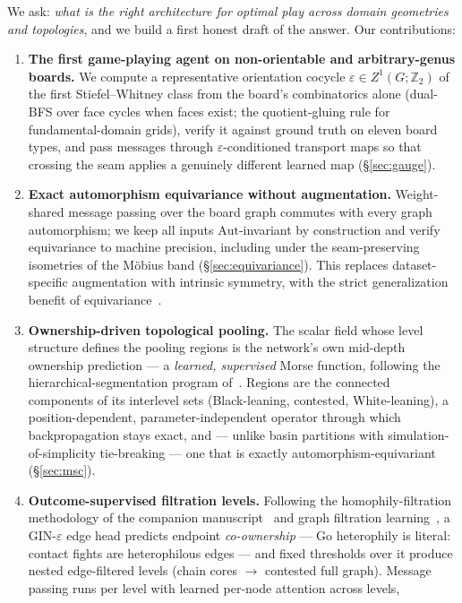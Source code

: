 \documentclass[11pt]{article}
\newcommand{\eps}{\varepsilon}
\newcommand{\Aut}{\mathrm{Aut}}
\newcommand{\ZZ}{\mathbb{Z}}
\begin{document}
We ask: \emph{what is the right architecture for optimal play across
domain geometries and topologies}, and we build a first honest draft of
the answer. Our contributions:
\begin{enumerate}
\item \textbf{The first game-playing agent on non-orientable and
  arbitrary-genus boards.} We compute a representative orientation
  cocycle $\eps\in Z^1(G;\ZZ_2)$ of the first Stiefel--Whitney class from
  the board's combinatorics alone (dual-BFS over face cycles when faces
  exist; the quotient-gluing rule for fundamental-domain grids), verify it
  against ground truth on eleven board types, and pass messages through
  $\eps$-conditioned transport maps so that crossing the seam applies a
  genuinely different learned map (\S\ref{sec:gauge}).
\item \textbf{Exact automorphism equivariance without augmentation.}
  Weight-shared message passing over the board graph commutes with every
  graph automorphism; we keep all inputs $\Aut$-invariant by construction
  and verify equivariance to machine precision, including under the
  seam-preserving isometries of the M\"obius band
  (\S\ref{sec:equivariance}). This replaces dataset-specific augmentation
  with intrinsic symmetry, with the strict generalization benefit of
  equivariance~\cite{elesedy2021}.
\item \textbf{Ownership-driven topological pooling.} The scalar field
  whose level structure defines the pooling regions is the network's own
  mid-depth ownership prediction --- a \emph{learned, supervised} Morse
  function, following the hierarchical-segmentation program
  of~\cite{leventhal2022}. Regions are the connected components of its
  interlevel sets (Black-leaning, contested, White-leaning), a
  position-dependent, parameter-independent operator through which
  backpropagation stays exact, and --- unlike basin partitions with
  simulation-of-simplicity tie-breaking --- one that is exactly
  automorphism-equivariant (\S\ref{sec:msc}).
\item \textbf{Outcome-supervised filtration levels.} Following the
  homophily-filtration methodology of the companion
  manuscript~\cite{leventhal2025filtration} and graph filtration
  learning~\cite{hofer2020}, a GIN-$\eps$ edge head predicts endpoint
  \emph{co-ownership} --- Go heterophily is literal: contact fights are
  heterophilous edges --- and fixed thresholds over it produce nested
  edge-filtered levels (chain cores $\to$ contested full graph). Message
  passing runs per level with learned per-node attention across levels,

\end{enumerate}
\end{document}
